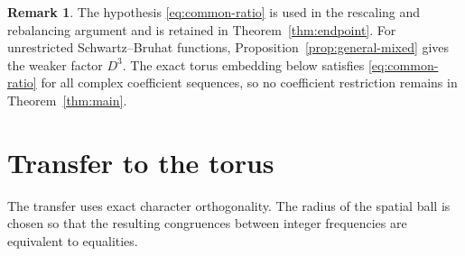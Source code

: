 \documentclass[11pt,twoside,a4paper]{article}
\numberwithin{equation}{section}
\theoremstyle{definition}
\newtheorem{remark}[theorem]{Remark}
\begin{document}
\begin{remark}
The hypothesis \eqref{eq:common-ratio} is used in the rescaling and rebalancing argument and is retained in Theorem~\ref{thm:endpoint}. For unrestricted Schwartz--Bruhat functions, Proposition~\ref{prop:general-mixed} gives the weaker factor $D^3$. The exact torus embedding below satisfies \eqref{eq:common-ratio} for all complex coefficient sequences, so no coefficient restriction remains in Theorem~\ref{thm:main}.
\end{remark}
\section{Transfer to the torus}\label{sec:transfer}
The transfer uses exact character orthogonality. The radius of the spatial ball is chosen so that the resulting congruences between integer frequencies are equivalent to equalities.
\end{document}
